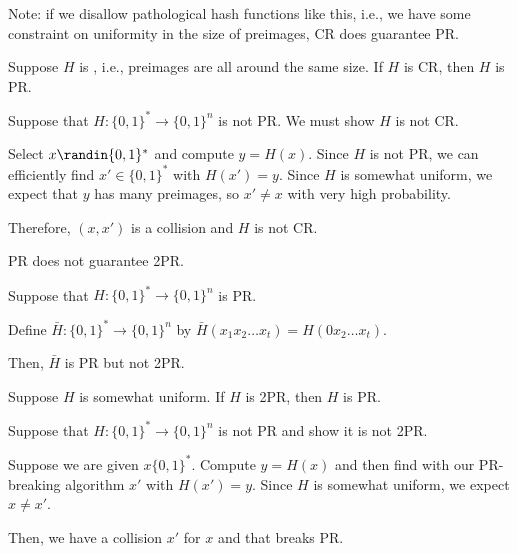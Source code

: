 \documentclass[class=co487,tikz,notes]{agony}
\begin{document}
Note: if we disallow pathological hash functions like this, i.e.,
we have some constraint on uniformity in the size of preimages,
CR does guarantee PR.

\begin{prop}
  Suppose $H$ is , i.e., preimages are all around the same size.
  If $H$ is CR, then $H$ is PR.
\end{prop}
\begin{prf}
  Suppose that $H : \{0,1\}^* \to \{0,1\}^n$ is not PR.
  We must show $H$ is not CR.

  Select $x \randin \{0,1\}^*$ and compute $y = H(x)$.
  Since $H$ is not PR, we can efficiently find $x' \in \{0,1\}^*$ with $H(x') = y$.
  Since $H$ is somewhat uniform, we expect that $y$ has many preimages,
  so $x' \neq x$ with very high probability.

  Therefore, $(x,x')$ is a collision and $H$ is not CR.
\end{prf}

\begin{prop}
  PR does not guarantee 2PR.
\end{prop}
\begin{prf}
  Suppose that $H : \{0,1\}^* \to \{0,1\}^n$ is PR.

  Define $\bar H : \{0,1\}^* \to \{0,1\}^n$ by $\bar H(x_1x_2\dots x_t) = H(0x_2\dots x_t)$.

  Then, $\bar H$ is PR but not 2PR.
\end{prf}

\begin{prop}
  Suppose $H$ is somewhat uniform. If $H$ is 2PR, then $H$ is PR.
\end{prop}
\begin{prf}
  Suppose that $H : \{0,1\}^* \to \{0,1\}^n$ is not PR and show it is not 2PR.

  Suppose we are given $x \{0,1\}^*$.
  Compute $y = H(x)$ and then find with our PR-breaking algorithm $x'$ with $H(x') = y$.
  Since $H$ is somewhat uniform, we expect $x \neq x'$.

  Then, we have a collision $x'$ for $x$ and that breaks PR.
\end{prf}
\end{document}
